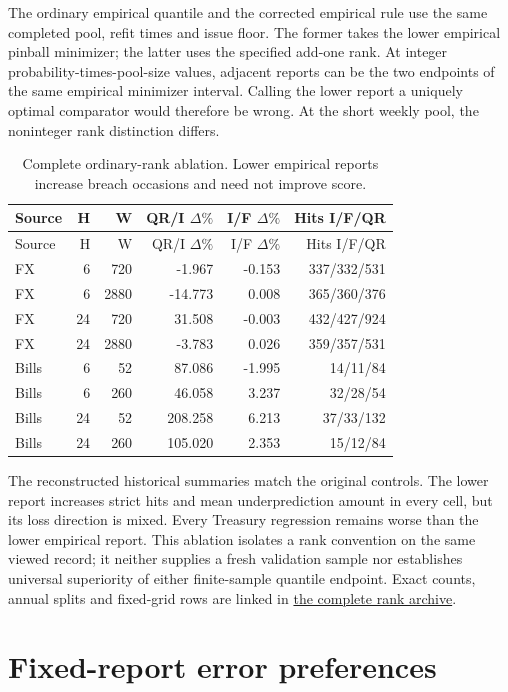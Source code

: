 \documentclass[11pt,a4paper]{article}
\begin{document}
The ordinary empirical quantile and the corrected empirical rule use
the same completed pool, refit times and issue floor. The former takes the
lower empirical pinball minimizer; the latter uses the specified add-one rank.
At integer probability-times-pool-size values, adjacent reports can be the two
endpoints of the same empirical minimizer interval. Calling the lower report a
uniquely optimal comparator would therefore be wrong. At the short weekly pool,
the noninteger rank distinction differs.
\begingroup
\small
\setlength{\tabcolsep}{3pt}
\renewcommand{\arraystretch}{1.12}
\begin{longtable}{lrrrrr}
\caption{Complete ordinary-rank ablation. Lower empirical reports increase breach occasions and need not improve score.}\\
\toprule
Source & H & W & QR/I \(\Delta\%\) & I/F \(\Delta\%\) & Hits I/F/QR \\
\midrule
\endfirsthead
\toprule
Source & H & W & QR/I \(\Delta\%\) & I/F \(\Delta\%\) & Hits I/F/QR \\
\midrule
\endhead
\bottomrule
\endfoot
FX & 6 & 720 & -1.967 & -0.153 & 337/332/531 \\
FX & 6 & 2880 & -14.773 & 0.008 & 365/360/376 \\
FX & 24 & 720 & 31.508 & -0.003 & 432/427/924 \\
FX & 24 & 2880 & -3.783 & 0.026 & 359/357/531 \\
Bills & 6 & 52 & 87.086 & -1.995 & 14/11/84 \\
Bills & 6 & 260 & 46.058 & 3.237 & 32/28/54 \\
Bills & 24 & 52 & 208.258 & 6.213 & 37/33/132 \\
Bills & 24 & 260 & 105.020 & 2.353 & 15/12/84 \\
\end{longtable}
\endgroup

The reconstructed historical summaries match the original controls.
The lower report increases strict hits and mean underprediction amount in every
cell, but its loss direction is mixed. Every Treasury regression remains worse
than the lower empirical report. This ablation isolates a rank convention on
the same viewed record; it neither supplies a fresh validation sample nor
establishes universal superiority of either finite-sample quantile endpoint.
Exact counts, annual splits and fixed-grid rows are linked in \href{https://github.com/ByronLi0207/financial-mathematics-paper-20261020/blob/revision-v7-final/results/revision-20261022/rank-ablation/README.md}{the complete rank archive}.\section{Fixed-report error preferences}\label{sup:preference}
\end{document}
